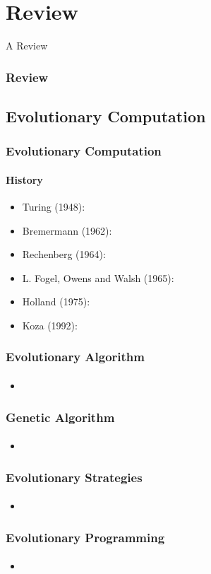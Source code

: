 \section{Review}

\frame
{
	\begin{center}
		\LARGE A Review
	\end{center}
}

\frame
{
	\frametitle{Review}
}

\subsection{Evolutionary Computation}

\frame
{
	\frametitle{Evolutionary Computation}
	\framesubtitle{History}

	\begin{itemize}
		\item Turing (1948): 
		\item Bremermann (1962):
		\item Rechenberg (1964):
		\item L. Fogel, Owens and Walsh (1965):
		\item Holland (1975):
		\item Koza (1992):
	\end{itemize}
}

\frame
{
	\frametitle{Evolutionary Algorithm}
	\framesubtitle{}

	\begin{itemize}
		\item 
	\end{itemize}
}

\frame
{
	\frametitle{Genetic Algorithm}
	\framesubtitle{}

	\begin{itemize}
		\item 
	\end{itemize}
}

\frame
{
	\frametitle{Evolutionary Strategies}
	\framesubtitle{}

	\begin{itemize}
		\item 
	\end{itemize}
}

\frame
{
	\frametitle{Evolutionary Programming}
	\framesubtitle{}

	\begin{itemize}
		\item 
	\end{itemize}
}

